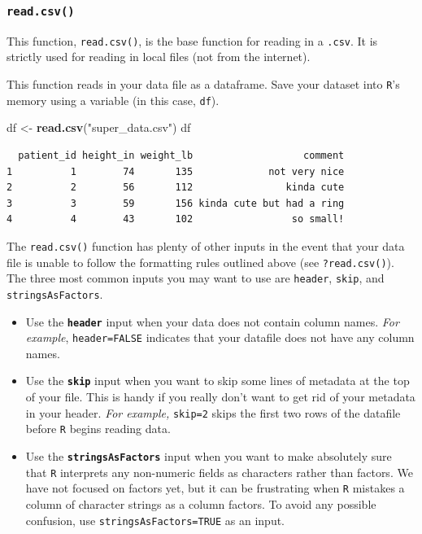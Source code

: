 \documentclass[]{book}
\newenvironment{Shaded}{\begin{snugshade}}{\end{snugshade}}
\newcommand{\KeywordTok}[1]{\textcolor[rgb]{0.13,0.29,0.53}{\textbf{#1}}}
\newcommand{\NormalTok}[1]{#1}
\newcommand{\StringTok}[1]{\textcolor[rgb]{0.31,0.60,0.02}{#1}}
\begin{document}
\hypertarget{read.csv}{%
\subsubsection*{\texorpdfstring{\texttt{read.csv()}}{read.csv()}}\label{read.csv}}

This function, \texttt{read.csv()}, is the base function for reading in a \texttt{.csv}. It is strictly used for reading in local files (not from the internet).

This function reads in your data file as a dataframe. Save your dataset into \texttt{R}'s memory using a variable (in this case, \texttt{df}).

\begin{Shaded}
\begin{Highlighting}[]
\NormalTok{df <-}\StringTok{ }\KeywordTok{read.csv}\NormalTok{(}\StringTok{"super_data.csv"}\NormalTok{)}
\NormalTok{df}
\end{Highlighting}
\end{Shaded}

\begin{verbatim}
  patient_id height_in weight_lb                   comment
1          1        74       135             not very nice
2          2        56       112                kinda cute
3          3        59       156 kinda cute but had a ring
4          4        43       102                 so small!
\end{verbatim}

The \texttt{read.csv()} function has plenty of other inputs in the event that your data file is unable to follow the formatting rules outlined above (see \texttt{?read.csv()}). The three most common inputs you may want to use are \texttt{header}, \texttt{skip}, and \texttt{stringsAsFactors}.

\begin{itemize}
\item
  Use the \textbf{\texttt{header}} input when your data does not contain column names. \emph{For example}, \texttt{header=FALSE} indicates that your datafile does not have any column names.
\item
  Use the \textbf{\texttt{skip}} input when you want to skip some lines of metadata at the top of your file. This is handy if you really don't want to get rid of your metadata in your header. \emph{For example,} \texttt{skip=2} skips the first two rows of the datafile before \texttt{R} begins reading data.
\item
  Use the \textbf{\texttt{stringsAsFactors}} input when you want to make absolutely sure that \texttt{R} interprets any non-numeric fields as characters rather than factors. We have not focused on factors yet, but it can be frustrating when \texttt{R} mistakes a column of character strings as a column factors. To avoid any possible confusion, use \texttt{stringsAsFactors=TRUE} as an input.
\end{itemize}
\end{document}

